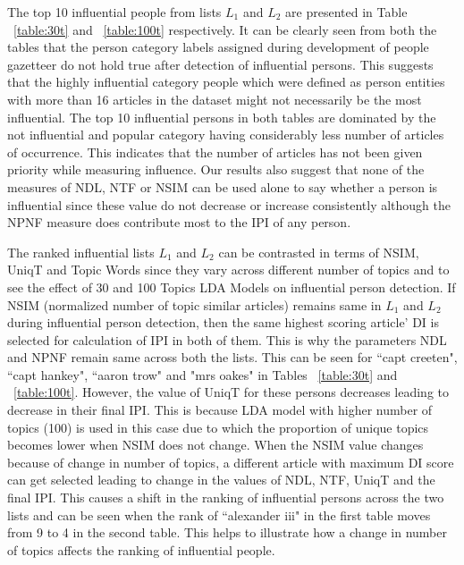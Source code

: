 
The top 10 influential people from lists $L_1$ and $L_2$ are presented in Table ~\ref{table:30t} and ~\ref{table:100t} respectively. It can be clearly seen from both the tables that the person category labels assigned during development of people gazetteer do not hold true after detection of influential persons. This suggests that the highly influential category people which were defined as person entities with more than 16 articles in the dataset might not necessarily be the most influential. The top 10 influential persons in both tables are dominated by the not influential and popular category having considerably less number of articles of occurrence. This indicates that the number of articles  has not been given priority while measuring influence. 
Our results also suggest that none of the measures of NDL, NTF or NSIM can be used alone to say whether a person is influential since these value do not decrease or increase consistently although the NPNF measure does contribute most to the IPI of any person.

The ranked influential lists $L_1$ and $L_2$ can be contrasted in terms of NSIM, UniqT and Topic Words since they vary across different number of topics and to see the effect of 30 and 100 Topics LDA Models on influential person detection.
 If NSIM (normalized number of topic similar articles) remains same in $L_1$ and $L_2$ during influential person detection, then the same highest scoring article' DI is selected for calculation of IPI in both of them. This is why the parameters NDL and NPNF remain same across both the lists. This can be seen for ``capt creeten", ``capt hankey", ``aaron trow" and "mrs oakes" in Tables ~\ref{table:30t} and ~\ref{table:100t}. However, the value of UniqT for these persons decreases leading to decrease in their final IPI. This is because LDA model with higher number of topics (100) is used in this case due to which the proportion of unique topics becomes lower when NSIM does not change. When the NSIM value changes because of change in number of topics, a different article with maximum DI score can get selected leading to change in the values of NDL, NTF, UniqT and the final IPI. This causes a shift in the ranking of influential persons across the two lists and can be seen when the rank of ``alexander iii" in the first table moves from 9 to 4 in the second table. 
This helps to illustrate how a change in number of topics affects the ranking of influential people.

